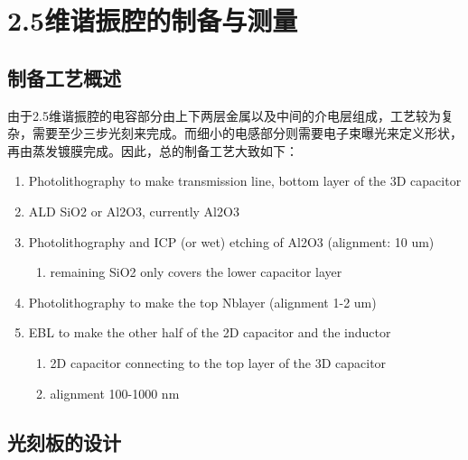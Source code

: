 \chapter{2.5维谐振腔的制备与测量} %
\label{cha:2_5维谐振腔的制备与测量}
	


        \section{制备工艺概述} %
        \label{sec:制备工艺概述}

            由于2.5维谐振腔的电容部分由上下两层金属以及中间的介电层组成，工艺较为复杂，需要至少三步光刻来完成。而细小的电感部分则需要电子束曝光来定义形状，再由蒸发镀膜完成。因此，总的制备工艺大致如下：
            \begin{enumerate}
                \item Photolithography to make transmission line, bottom layer of the 3D capacitor
                \item ALD SiO2 or Al2O3, currently Al2O3
                \item Photolithography and ICP (or wet) etching of Al2O3 (alignment: 10 um)
                    \begin{enumerate}
                        \item remaining SiO2 only covers the lower capacitor layer
                    \end{enumerate}
                \item Photolithography to make the top Nblayer (alignment 1-2 um)
                \item EBL to make the other half of the 2D capacitor and the inductor
                    \begin{enumerate}
                        \item 2D capacitor connecting to the top layer of the 3D capacitor
                        \item alignment 100-1000 nm
                    \end{enumerate}
            \end{enumerate}
            

        \section{光刻板的设计} %
        \label{sec:光刻板的设计}

